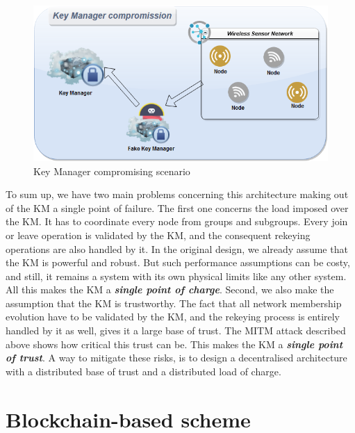 \begin{figure}[htbp]
	\centerline{\includegraphics[scale=0.55]{figures/mgkmp/comprom.png}}
	\caption{Key Manager compromising scenario}
	\label{fig:km_mitm}
\end{figure}

To sum up, we have two main problems concerning this architecture making out of the KM a single point of failure. The first one concerns the load imposed over the KM. It has to coordinate every node from groups and subgroups. Every join or leave operation is validated by the KM, and the consequent rekeying operations are also handled by it. In the original design, we already assume that the KM is powerful and robust. But such performance assumptions can be costy, and still, it remains a system with its own physical limits like any other system. All this makes the KM a \textbf{\textit{single point of charge}}. Second, we also make the assumption that the KM is trustworthy. The fact that all network membership evolution have to be validated by the KM, and the rekeying process is entirely handled by it as well, gives it a large base of trust. The MITM attack described above shows how critical this trust can be. This makes the KM a \textbf{\textit{single point of trust}}. A way to mitigate these risks, is to design a decentralised architecture with a distributed base of trust and a distributed load of charge.

\section{Blockchain-based scheme}

